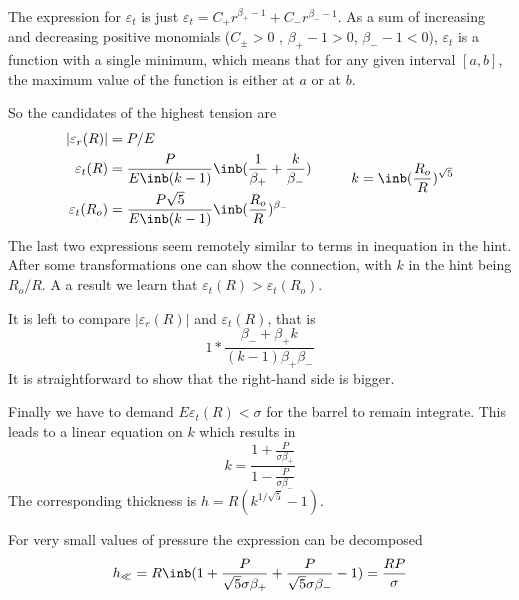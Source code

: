The expression for $\varepsilon_t$ is just $\varepsilon_t = C_+ r^{\beta_+ -1} + C_- r^{\beta_- -1}$.
As a sum of increasing and decreasing positive monomials ($C_\pm > 0$ , $\beta_+ -1 > 0$, $\beta_- -1 < 0$),
$\varepsilon_t$ is a function with a single minimum,
which means that for any given interval $[a, b]$,
the maximum value of the function is either at $a$ or at $b$.

So the candidates of the highest tension are
\begin{equation}
\begin{split}
    |\varepsilon_r(R)| &= P/E \\
    \varepsilon_t(R) &= \frac{P}{E \inb({ k - 1})} \inb({\frac{1}{\beta_+} + \frac{k}{\beta_-}}) \\
    \varepsilon_t(R_o) &= \frac{P \sqrt{5}}{E \inb({ k - 1})} \inb({\frac{R_o}{R}})^{\beta_-}
\end{split}
\hspace{1cm} k = \inb({\frac{R_o}{R}})^{\sqrt{5}}
\end{equation}
The last two expressions seem remotely similar to terms in
inequation in the hint.
After some transformations one can show the connection,
with $k$ in the hint being $R_o / R$.
A a result we learn that $\varepsilon_t(R) > \varepsilon_t(R_o)$.

It is left to compare $|\varepsilon_r(R)|$ and $\varepsilon_t(R)$,
that is
\begin{equation}
    1 * \frac{\beta_- + \beta_+ k}{(k - 1) \beta_+ \beta_-}
\end{equation}
It is straightforward to show that the right-hand side is bigger.

Finally we have to demand $E \varepsilon_t(R) < \sigma$
for the barrel to remain integrate.
This leads to a linear equation on $k$ which results in
\begin{equation}
    k = \frac{1+\frac{P}{\sigma \beta_+}}{1-\frac{P}{\sigma \beta_-}}
\end{equation}
The corresponding thickness is $h = R (k^{1/\sqrt{5}} - 1)$.

For very small values of pressure the expression can be decomposed
\begin{equation}
    h_{\ll} = R \inb({ 1 + \frac{P}{\sqrt{5} \sigma \beta_+}
    + \frac{P}{\sqrt{5} \sigma \beta_-} - 1}) = \frac{RP}{\sigma}
\end{equation}
